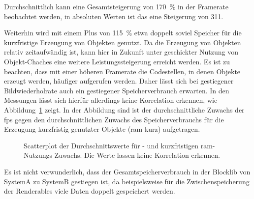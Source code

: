 Durchschnittlich kann eine Gesamtsteigerung von \SI{170}{\percent} in der Framerate beobachtet werden, in absoluten Werten ist das eine Steigerung von \SI{311}{\fps}.

Weiterhin wird mit einem Plus von \SI{115}{\percent} etwa doppelt soviel Speicher für die kurzfristige Erzeugung von Objekten genutzt. Da die Erzeugung von Objekten relativ zeitaufwändig ist, kann hier in Zukunft unter geschickter Nutzung von Objekt-Chaches eine weitere Leistungssteigerung erreicht werden. Es ist zu beachten, dass mit einer höheren Framerate die Codestellen, in denen Objekte erzeugt werden, häufiger aufgerufen werden. Daher lässt sich bei gestiegener Bildwiederholrate auch ein gestiegener Speicherverbrauch erwarten. In den Messungen lässt sich hierfür allerdings keine Korrelation erkennen, wie Abbildung~\ref{fig:Scatterplot} zeigt. In der Abbildung sind ist der durchschnittliche Zuwachs der \ac{fps} gegen den durchschnittlichen Zuwachs des Speicherverbrauchs für die Erzeugung kurzfristig genutzter Objekte (\ac{ram} kurz) aufgetragen. 
\begin{figure}
	\centering
		\caption[Scatterplot der Durchschnittswerte für - und kurzfristigen -Nutzungs-Zuwachs.]{Scatterplot der Durchschnittswerte für \si{\fps}- und kurzfristigen \ac{ram}-Nutzungs-Zuwachs. Die Werte lassen keine Korrelation erkennen.}\label{fig:Scatterplot}
\end{figure}

Es ist nicht verwunderlich, dass der Gesamtspeicherverbrauch in der Blocklib von SystemA zu SystemB gestiegen ist, da beispielsweise für die Zwischenspeicherung der Renderables viele Daten doppelt gespeichert werden. 